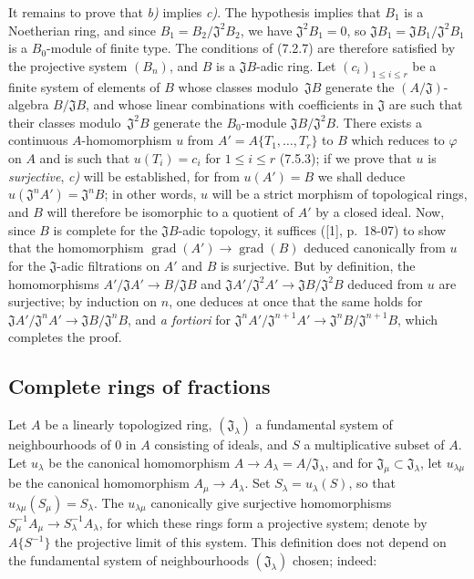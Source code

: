 It remains to prove that \emph{b)} implies \emph{c)}. The hypothesis implies that $B_1$ is a
Noetherian ring, and since $B_1=B_2/\mathfrak J^2B_2$, we have
$\mathfrak J^2B_1=0$, so
$\mathfrak JB_1=\mathfrak JB_1/\mathfrak J^2B_1$ is a $B_0$-module of finite
type. The conditions of (7.2.7) are therefore satisfied by the projective system
$(B_n)$, and $B$ is a $\mathfrak JB$-adic ring. Let
$(c_i)_{1\leq i\leq r}$ be a finite system of elements of $B$ whose classes
modulo~$\mathfrak JB$ generate the $(A/\mathfrak J)$-algebra
$B/\mathfrak JB$, and whose linear combinations with coefficients in
$\mathfrak J$ are such that their classes modulo~$\mathfrak J^2B$ generate
the $B_0$-module $\mathfrak JB/\mathfrak J^2B$. There exists a continuous
$A$-homomorphism $u$ from $A'=A\{T_1,\ldots,T_r\}$ to $B$ which
reduces to $\varphi$ on $A$ and is such that $u(T_i)=c_i$ for $1\leq i\leq r$
(7.5.3); if we prove that $u$ is \emph{surjective}, \emph{c)} will be established, for from
$u(A')=B$ we shall deduce $u(\mathfrak J^nA')=\mathfrak J^nB$; in other words, $u$
will be a strict morphism of topological rings, and $B$ will therefore be isomorphic to a
quotient of $A'$ by a closed ideal. Now, since $B$ is complete for the
$\mathfrak JB$-adic topology, it suffices ([1], p.~18-07) to show that
the homomorphism $\operatorname{grad}(A')\to\operatorname{grad}(B)$ deduced
canonically from $u$ for the $\mathfrak J$-adic filtrations on $A'$ and
$B$ is surjective. But by definition, the homomorphisms
$A'/\mathfrak JA'\to B/\mathfrak JB$ and
$\mathfrak JA'/\mathfrak J^2A'\to\mathfrak JB/\mathfrak J^2B$ deduced from $u$
are surjective; by induction on $n$, one deduces at once that the same holds for
$\mathfrak JA'/\mathfrak J^nA'\to\mathfrak JB/\mathfrak J^nB$, and
\emph{a fortiori} for
$\mathfrak J^nA'/\mathfrak J^{n+1}A'\to
\mathfrak J^nB/\mathfrak J^{n+1}B$, which completes the proof.

\subsection{Complete rings of fractions}
\label{subsection:0.7.6}

\begin{env}[7.6.1]
\label{0.7.6.1}
Let $A$ be a linearly topologized ring, $(\mathfrak J_\lambda)$ a
fundamental system of neighbourhoods of 0 in $A$ consisting of ideals, and $S$ a
multiplicative subset of $A$. Let $u_\lambda$ be the canonical homomorphism
$A\to A_\lambda=A/\mathfrak J_\lambda$, and for
$\mathfrak J_\mu\subset\mathfrak J_\lambda$, let $u_{\lambda\mu}$ be
the canonical homomorphism $A_\mu\to A_\lambda$. Set
$S_\lambda=u_\lambda(S)$, so that
$u_{\lambda\mu}(S_\mu)=S_\lambda$. The $u_{\lambda\mu}$ canonically give
surjective homomorphisms
$S_\mu^{-1}A_\mu\to S_\lambda^{-1}A_\lambda$, for which these rings
form a projective system; denote by $A\{S^{-1}\}$ the projective
limit of this system. This definition does not depend on the fundamental system
of neighbourhoods $(\mathfrak J_\lambda)$ chosen; indeed:
\end{env}

